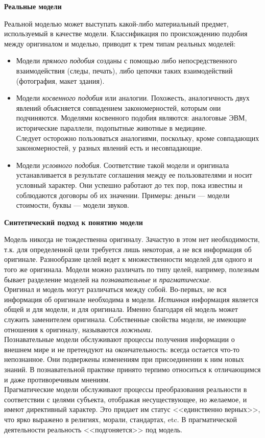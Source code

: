 \documentclass{article}
\newcommand{\note}[1]{\textit{#1}}
\renewcommand{\subsection}[1]{
	\vspace{2em}
	\begin{flushright}
		\large
		\textbf{#1}
	\end{flushright}
	}
\begin{document}
\subsection{Реальные модели}
Реальной моделью может выступать какой-либо материальный предмет, используемый в качестве модели. Классификация по происхождению подобия между оригиналом и моделью, приводит к трем типам реальных моделей:
\begin{itemize}
	\item Модели \note{прямого подобия} созданы с помощью либо непосредственного взаимодействия (следы, печать), либо цепочки таких взаимодействий (фотография, макет здания).
	\item Модели \note{косвенного подобия} или аналогии. Похожесть, аналогичность двух явлений объясняется совпадением закономерностей, которым они подчиняются. Моделями косвенного подобия являются: аналоговые ЭВМ, исторические параллели, подопытные животные в медицине.\\
	Следует осторожно пользоваться аналогиями, поскольку, кроме совпадающих закономерностей, у разных явлений есть и несовпадающие.
	\item Модели \note{условного подобия}. Соответствие такой модели и оригинала устанавливается в результате соглашения между ее пользователями и носит условный характер. Они успешно работают до тех пор, пока известны и соблюдаются договоры об их значении. Примеры: деньги --- модели стоимости, буквы --- модели звуков.
\end{itemize}
\subsection{Синтетический подход к понятию модели}
Модель никогда не тождественна оригиналу. Зачастую в этом нет необходимости, т.к. для определенной цели требуется лишь некоторая, а не вся информация об оригинале. Разнообразие целей ведет к множественности моделей для одного и того же оригинала. Модели можно различать по типу целей, например, полезным бывает разделение моделей на \note{познавательные} и \note{прагматические}.\\
Оригинал и модель могут различаться между собой. Во-первых, не вся информация об оригинале необходима в модели. \note{Истинная} информация является общей и для модели, и для оригинала. Именно благодаря ей модель может служить заменителем оригинала. Собственные свойства модели, не имеющие отношения к оригиналу, называются \note{ложными}.\\
Познавательные модели обслуживают процессы получения информации о внешнем мире и не претендуют на окончательность: всегда остается что-то непознанное. Они подвержены изменениям при присоединении к ним новых знаний. В познавательной практике принято терпимо относиться к отличающимся и даже противоречивым мнениям.\\
Прагматические модели обслуживают процессы преобразования реальности в соответствии с целями субъекта, отображая несуществующее, но желаемое, и имеют директивный характер. Это придает им статус <<единственно верных>>, что ярко выражено в религиях, морали, стандартах, etc. В прагматической деятельности реальность <<подгоняется>> под модель.
\end{document}
